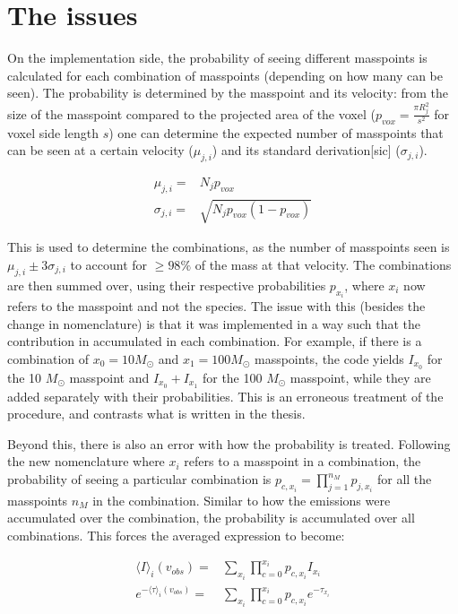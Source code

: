 \documentclass[onecolumn]{article}
\begin{document}
  \section{The issues}
  On the implementation side, the probability of seeing different masspoints is calculated for each combination of masspoints (depending on how many can be seen). The probability is determined by the masspoint and its velocity: from the size of the masspoint compared to the projected area of the voxel ($p_{vox}=\frac{\pi R_j^2}{s^2}$ for voxel side length $s$) one can determine the expected number of masspoints that can be seen at a certain velocity ($\mu_{j,i}$) and its standard derivation[sic] ($\sigma_{j,i}$).
  
  \begin{align*}
    \mu_{j,i} =& N_j p_{vox} \\
    \sigma_{j,i} =& \sqrt{N_j p_{vox} (1-p_{vox})}
  \end{align*}
  
  This is used to determine the combinations, as the number of masspoints seen is $\mu_{j,i} \pm 3\sigma_{j,i}$ to account for $\geq 98 \%$ of the mass at that velocity. The combinations are then summed over, using their respective probabilities $p_{x_i}$, where $x_i$ now refers to the masspoint and not the species. The issue with this (besides the change in nomenclature) is that it was implemented in a way such that the contribution in accumulated in each combination. For example, if there is a combination of $x_0 = 10 M_\odot$ and $x_1 = 100 M_\odot$ masspoints, the code yields $I_{x_0}$ for the 10 $M_\odot$ masspoint and $I_{x_0}+I_{x_1}$ for the 100 $M_\odot$ masspoint, while they are added separately with their probabilities. This is an erroneous treatment of the procedure, and contrasts what is written in the thesis.
  
  Beyond this, there is also an error with how the probability is treated. Following the new nomenclature where $x_i$ refers to a masspoint in a combination, the probability of seeing a particular combination is $p_{c,x_i} = \prod_{j=1}^{n_M} p_{j,x_i}$ for all the masspoints $n_M$ in the combination. Similar to how the emissions were accumulated over the combination, the probability is accumulated over all combinations. This forces the averaged expression to become:
  
  \begin{align*}
    \langle I \rangle_i(v_{obs}) =& \sum_{x_i} \prod_{c=0}^{x_i} p_{c,x_i} I_{x_i} \\
    e^{-\langle \tau \rangle_i(v_{obs})} =& \sum_{x_i} \prod_{c=0}^{x_i} p_{c,x_i} e^{-\tau_{x_i}}
  \end{align*}
  
\end{document}
